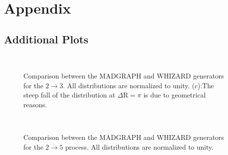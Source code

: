 \chapter*{Appendix}

\section*{Additional Plots} \label{sec_addplots}

\begin{figure}[ht]
\centering
  \\
  \caption{Comparison between the MADGRAPH and WHIZARD generators for the $2 \to 3$. All distributions are normalized to unity. (c):The steep fall of the distribution at $\Delta \mathrm{R} = \pi$ is due to geometrical reasons.}
  \label{fig_simu_comp_2to3_2}
\end{figure} 


\begin{figure}[ht]
\centering
  \\
  \caption{Comparison between the MADGRAPH and WHIZARD generators for the $2 \to 5$ process. All distributions are normalized to unity.}
  \label{fig_simu_comp_2to5_2}
\end{figure}


